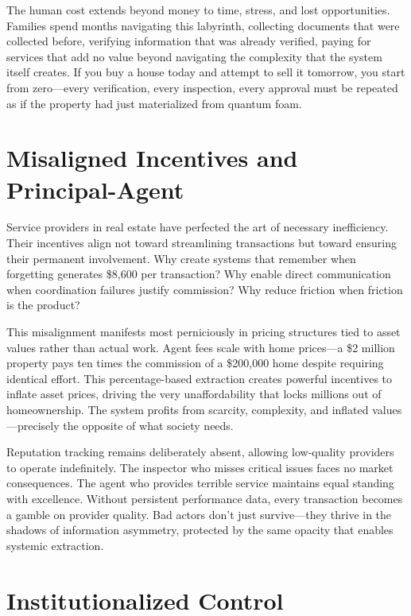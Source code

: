 The human cost extends beyond money to time, stress, and lost opportunities. Families spend months navigating this labyrinth, collecting documents that were collected before, verifying information that was already verified, paying for services that add no value beyond navigating the complexity that the system itself creates. If you buy a house today and attempt to sell it tomorrow, you start from zero—every verification, every inspection, every approval must be repeated as if the property had just materialized from quantum foam.

\section{Misaligned Incentives and Principal-Agent}

Service providers in real estate have perfected the art of necessary inefficiency. Their incentives align not toward streamlining transactions but toward ensuring their permanent involvement. Why create systems that remember when forgetting generates \$8,600 per transaction? Why enable direct communication when coordination failures justify commission? Why reduce friction when friction is the product?

This misalignment manifests most perniciously in pricing structures tied to asset values rather than actual work. Agent fees scale with home prices—a \$2 million property pays ten times the commission of a \$200,000 home despite requiring identical effort. This percentage-based extraction creates powerful incentives to inflate asset prices, driving the very unaffordability that locks millions out of homeownership. The system profits from scarcity, complexity, and inflated values—precisely the opposite of what society needs.

Reputation tracking remains deliberately absent, allowing low-quality providers to operate indefinitely. The inspector who misses critical issues faces no market consequences. The agent who provides terrible service maintains equal standing with excellence. Without persistent performance data, every transaction becomes a gamble on provider quality. Bad actors don't just survive—they thrive in the shadows of information asymmetry, protected by the same opacity that enables systemic extraction.

\section{Institutionalized Control}

